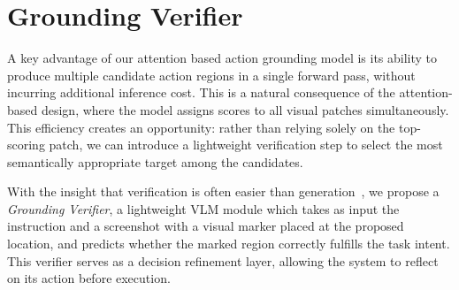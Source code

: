 \documentclass{article}
\newcommand{\sys}{\texttt{GUI-Actor}\xspace}
\begin{document}
\section{Grounding Verifier}
A key advantage of our attention based action grounding model is its ability to produce multiple candidate action regions in a single forward pass, without incurring additional inference cost. This is a natural consequence of the attention-based design, where the model assigns scores to all visual patches simultaneously. This efficiency creates an opportunity: rather than relying solely on the top-scoring patch, we can introduce a lightweight verification step to select the most semantically appropriate target among the candidates.

With the insight that verification is often easier than generation~\citep{cobbe2021training}, we propose a \textit{Grounding Verifier}, a lightweight VLM module which takes as input the instruction and a screenshot with a visual marker placed at the proposed location, and predicts whether the marked region correctly fulfills the task intent. This verifier serves as a decision refinement layer, allowing the system to reflect on its action before execution.
\end{document}
